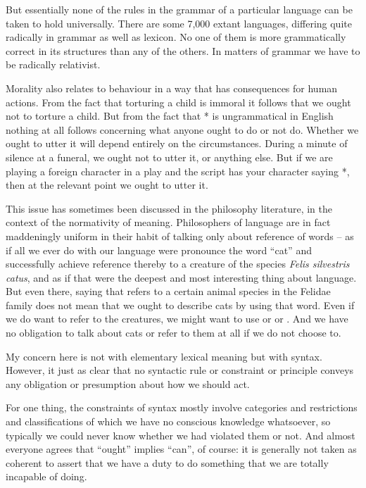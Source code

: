 \documentclass[output=paper]{langscibook}
\begin{document}
But essentially none of the rules in the grammar of a particular language can be taken to hold universally. There are some 7,000 extant languages, differing quite radically in grammar as well as lexicon.  No one of them is more grammatically correct in its structures than any of the others. In matters of grammar we have to be radically relativist.

Morality also relates to behaviour in a way that has consequences for human actions.  From the fact that torturing a child is immoral it follows that we ought not to torture a child.  But from the fact that * is ungrammatical in English nothing at all follows concerning what anyone ought to do or not do.  Whether we ought to utter it will depend entirely on the circumstances.  During a minute of silence at a funeral, we ought not to utter it, or anything else.  But if we are playing a foreign character in a play and the script has your character saying *, then at the relevant point we ought to utter it.

This issue has sometimes been discussed in the philosophy literature, in the context of the normativity of meaning.  Philosophers of language are in fact maddeningly uniform in their habit of talking only about reference of words -- as if all we ever do with our language were pronounce the word ``cat'' and successfully achieve reference thereby to a creature of the species \textit{Felis silvestris catus}, and as if that were the deepest and most interesting thing about language.  But even there, saying that  refers to a certain animal species in the Felidae family does not mean that we ought to describe cats by using that word.  Even if we do want to refer to the creatures, we might want to use  or  or .  And we have no obligation to talk about cats or refer to them at all if we do not choose to.

My concern here is not with elementary lexical meaning but with syntax. However, it just as clear that no syntactic rule or constraint or principle conveys any obligation or presumption about how we should act.

For one thing, the constraints of syntax mostly involve categories and restrictions and classifications of which we have no conscious knowledge whatsoever, so typically we could never know whether we had violated them or not.  And almost everyone agrees that ``ought'' implies ``can'', of course: it is generally not taken as coherent to assert that we have a duty to do something that we are totally incapable of doing.
\end{document}
